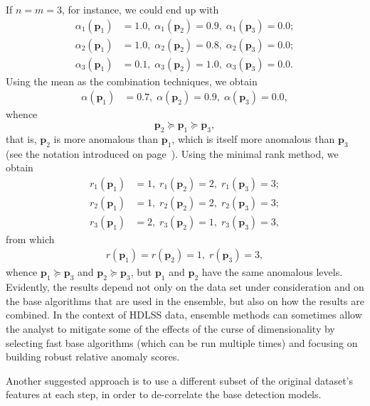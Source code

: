 If $n=m=3$, for instance, we could end up with 
\begin{align*}\alpha_{1}\left(\mathbf{p}_{1}\right)&=1.0,\; \alpha_{1}\left(\mathbf{p}_{2}\right)=0.9,\; \alpha_{1}\left(\mathbf{p}_{3}\right)=0.0; \\ 
\alpha_{2}\left(\mathbf{p}_{1}\right)&=1.0,\; \alpha_{2}\left(\mathbf{p}_{2}\right)=0.8,\; \alpha_{2}\left(\mathbf{p}_{3}\right)=0.0;\\
\alpha_{3}\left(\mathbf{p}_{1}\right)&=0.1,\;  \alpha_{3}\left(\mathbf{p}_{2}\right)=1.0,\; \alpha_{3}\left(\mathbf{p}_{3}\right)=0.0.
\end{align*}
Using the mean as the combination techniques, we obtain
\begin{align*}
\alpha\left(\mathbf{p}_{1}\right)&=0.7,\; \alpha\left(\mathbf{p}_{2}\right)=0.9,\; \alpha\left(\mathbf{p}_{3}\right)=0.0,
\end{align*}
whence $$\mathbf{p}_2\succeq \mathbf{p}_1\succeq \mathbf{p}_3,$$ that is, $\mathbf{p}_2$ is more anomalous than $\mathbf{p}_1$, which is itself more anomalous than  $\mathbf{p}_3$ (see the notation introduced on page~\pageref{succeq}). 
\newl 
Using the minimal rank method, we obtain 
\begin{align*}
r_{1}\left(\mathbf{p}_{1}\right)&=1,\; r_{1}\left(\mathbf{p}_{2}\right)=2,\; r_{1}\left(\mathbf{p}_{3}\right)=3;\\ 
r_{2}\left(\mathbf{p}_{1}\right)&=1,\; r_{2}\left(\mathbf{p}_{2}\right)=2,\; r_{2}\left(\mathbf{p}_{3}\right)=3;\\
r_{3}\left(\mathbf{p}_{1}\right)&=2,\; r_{3}\left(\mathbf{p}_{2}\right)=1,\; r_{3}\left(\mathbf{p}_{3}\right)=3,
\end{align*}
from which 
\begin{align*}
r\left(\mathbf{p}_{1}\right)=r\left(\mathbf{p}_{2}\right)=1,\; r \left(\mathbf{p}_{3}\right)=3, 
\end{align*}
whence $\mathbf{p}_1\succeq \mathbf{p}_3$ and $\mathbf{p}_2\succeq \mathbf{p}_3$, but $\mathbf{p}_1$ and  $\mathbf{p}_2$ have the same anomalous levels. 
\newl Evidently, the results depend not only on the data set under consideration and on the base algorithms that are used in the ensemble, but also on how the results are combined. 
\newl In the context of HDLSS data, ensemble methods can sometimes allow the analyst to mitigate some of the effects of the curse of dimensionality by selecting fast base algorithms (which can be run multiple times) and focusing on building robust relative anomaly scores. \par Another suggested  approach is to use a different subset of the original dataset's features at each step, in order to de-correlate the base detection models. 
%
%



